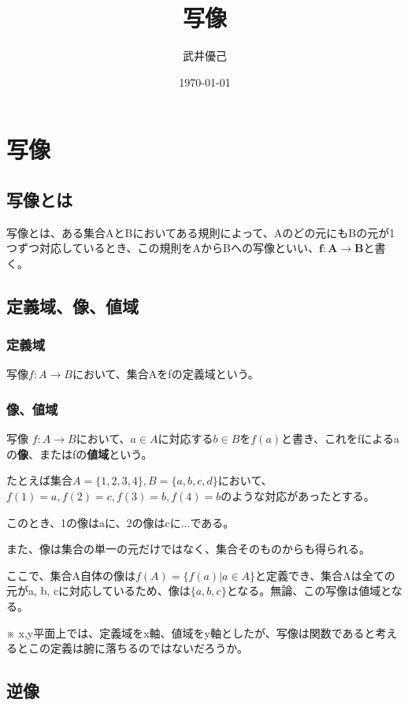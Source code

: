 \documentclass[dvipdfmx,autodetect-engine]{jsarticle}
\title{写像}
\author{武井優己}
\date{\today}
\begin{document}
\maketitle
\section{写像}

\subsection{写像とは}

写像とは、ある集合AとBにおいてある規則によって、Aのどの元にもBの元が1つずつ対応しているとき、この規則をAからBへの写像といい、$\boldsymbol{f: A \to B}$と書く。

\subsection{定義域、像、値域}

\subsubsection[a]{定義域}

写像$f: A \to B$において、集合Aをfの定義域という。

\subsubsection{像、値域}

写像 $f: A \to B$において、$a \in A$に対応する$b \in B$を$f(a)$と書き、これをfによるaの{\bf 像}、またはfの{\bf 値域}という。
{\newline}

たとえば集合$A = \{ 1, 2, 3, 4 \}, B = \{ a, b, c, d\}$において、
$f(1) = a, f(2) = c, f(3) = b, f(4) = b$のような対応があったとする。

このとき、1の像はaに、2の像はcに...である。

また、像は集合の単一の元だけではなく、集合そのものからも得られる。

ここで、集合A自体の像は$f(A) = \{f(a) | a \in A\}$と定義でき、集合Aは全ての元がa, b, cに対応しているため、像は$\{a, b, c\}$となる。無論、この写像は値域となる。
{\newline}

※ x,y平面上では、定義域をx軸、値域をy軸としたが、写像は関数であると考えるとこの定義は腑に落ちるのではないだろうか。

\subsection{逆像}
\end{document}
